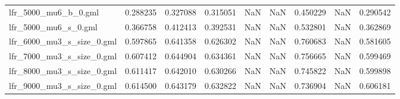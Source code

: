 \begin{tabular}{lrrrrrrrr}
lfr\_5000\_mu6\_b\_0.gml       &                            0.288235 &                       0.327088 &                          0.315051 &                           NaN &                             NaN &                     0.450229 &                                 NaN &                                0.290542 \\
lfr\_5000\_mu6\_s\_0.gml       &                            0.366758 &                       0.412413 &                          0.392531 &                           NaN &                             NaN &                     0.532801 &                                 NaN &                                0.362869 \\
lfr\_6000\_mu3\_s\_size\_0.gml  &                            0.597865 &                       0.641358 &                          0.626302 &                           NaN &                             NaN &                     0.760683 &                                 NaN &                                0.581605 \\
lfr\_7000\_mu3\_s\_size\_0.gml  &                            0.607412 &                       0.644904 &                          0.634361 &                           NaN &                             NaN &                     0.756665 &                                 NaN &                                0.599469 \\
lfr\_8000\_mu3\_s\_size\_0.gml  &                            0.611417 &                       0.642010 &                          0.630266 &                           NaN &                             NaN &                     0.745822 &                                 NaN &                                0.599898 \\
lfr\_9000\_mu3\_s\_size\_0.gml  &                            0.614500 &                       0.643179 &                          0.632822 &                           NaN &                             NaN &                     0.736904 &                                 NaN &                                0.606181 \\
\bottomrule
\end{tabular}

